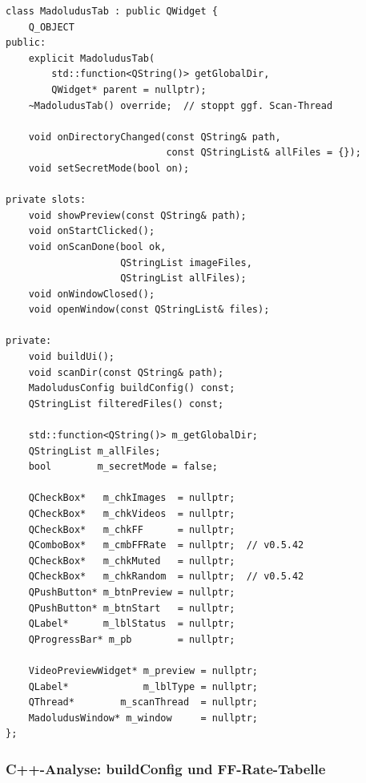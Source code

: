 \begin{lstlisting}[style=header, caption={madoludustab.h -- Kern}]
class MadoludusTab : public QWidget {
    Q_OBJECT
public:
    explicit MadoludusTab(
        std::function<QString()> getGlobalDir,
        QWidget* parent = nullptr);
    ~MadoludusTab() override;  // stoppt ggf. Scan-Thread

    void onDirectoryChanged(const QString& path,
                            const QStringList& allFiles = {});
    void setSecretMode(bool on);

private slots:
    void showPreview(const QString& path);
    void onStartClicked();
    void onScanDone(bool ok,
                    QStringList imageFiles,
                    QStringList allFiles);
    void onWindowClosed();
    void openWindow(const QStringList& files);

private:
    void buildUi();
    void scanDir(const QString& path);
    MadoludusConfig buildConfig() const;
    QStringList filteredFiles() const;

    std::function<QString()> m_getGlobalDir;
    QStringList m_allFiles;
    bool        m_secretMode = false;

    QCheckBox*   m_chkImages  = nullptr;
    QCheckBox*   m_chkVideos  = nullptr;
    QCheckBox*   m_chkFF      = nullptr;
    QComboBox*   m_cmbFFRate  = nullptr;  // v0.5.42
    QCheckBox*   m_chkMuted   = nullptr;
    QCheckBox*   m_chkRandom  = nullptr;  // v0.5.42
    QPushButton* m_btnPreview = nullptr;
    QPushButton* m_btnStart   = nullptr;
    QLabel*      m_lblStatus  = nullptr;
    QProgressBar* m_pb        = nullptr;

    VideoPreviewWidget* m_preview = nullptr;
    QLabel*             m_lblType = nullptr;
    QThread*        m_scanThread  = nullptr;
    MadoludusWindow* m_window     = nullptr;
};
\end{lstlisting}

\subsubsection{C++-Analyse: buildConfig und FF-Rate-Tabelle}

